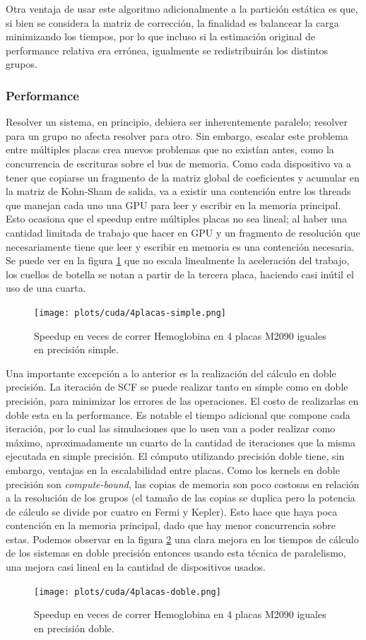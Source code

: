Otra ventaja de usar este algoritmo adicionalmente a la partici\'on est\'atica es que, si bien se considera la matriz
de correcci\'on, la finalidad es balancear la carga minimizando los tiempos, por lo que incluso si la estimaci\'on original
de performance relativa era err\'onea, igualmente se redistribuir\'an los distintos grupos.

\subsubsection{Performance}

Resolver un sistema, en principio, debiera ser inherentemente paralelo; resolver para un grupo
no afecta resolver para otro. Sin embargo, escalar este problema entre m\'ultiples placas crea
nuevos problemas que no exist\'ian antes, como la concurrencia de escrituras sobre el bus de memoria.
Como cada dispositivo va a tener que copiarse un fragmento de la matriz global de coeficientes
y acumular en la matriz de Kohn-Sham de salida, va a existir una contenci\'on entre los threads que manejan
cada uno una GPU para leer y escribir en la memoria principal. Esto ocasiona que el speedup entre
m\'ultiples placas no sea lineal; al haber una cantidad limitada de trabajo que hacer en GPU y un fragmento de
resoluci\'on que necesariamente tiene que leer y escribir en memoria es una contenci\'on necesaria. Se puede
ver en la figura \ref{plt:4placas-simple} que no escala linealmente la aceleraci\'on del trabajo, los cuellos
de botella se notan a partir de la tercera placa, haciendo casi in\'util el uso de una cuarta.

\begin{figure}[htbp]
   \centering
   \texttt{[image: plots/cuda/4placas-simple.png]}
   \caption{Speedup en veces de correr Hemoglobina en 4 placas M2090 iguales en precisi\'on simple.}
   \label{plt:4placas-simple}
\end{figure}

Una importante excepci\'on a lo anterior es la realizaci\'on del c\'alculo en doble precisi\'on. La iteraci\'on
de SCF se puede realizar tanto en simple como en doble precisi\'on, para minimizar los
errores de las operaciones. El costo de realizarlas en doble esta en la performance. Es notable
el tiempo adicional que compone cada iteraci\'on, por lo cual las simulaciones que lo usen van
a poder realizar como m\'aximo, aproximadamente un cuarto de la cantidad de iteraciones que la misma ejecutada en simple precisi\'on.
El c\'omputo utilizando precisi\'on doble tiene, sin embargo, ventajas en la escalabilidad entre placas.
Como los kernels en doble precisi\'on son \textit{compute-bound}, las copias de memoria son poco costosas
en relaci\'on a la resoluci\'on de los grupos (el tama\~no de las copias se duplica pero la potencia de c\'alculo se divide
por cuatro en Fermi y Kepler). Esto hace que haya poca contenci\'on en la memoria principal,
dado que hay menor concurrencia sobre estas. Podemos observar en la figura \ref{plt:4placas-doble} una clara mejora en los tiempos
de c\'alculo de los sistemas en doble precisi\'on entonces usando esta t\'ecnica de paralelismo, una mejora casi
lineal en la cantidad de dispositivos usados.

\begin{figure}[htbp]
   \centering
   \texttt{[image: plots/cuda/4placas-doble.png]}
   \caption{Speedup en veces de correr Hemoglobina en 4 placas M2090 iguales en precisi\'on doble.}
   \label{plt:4placas-doble}
\end{figure}

